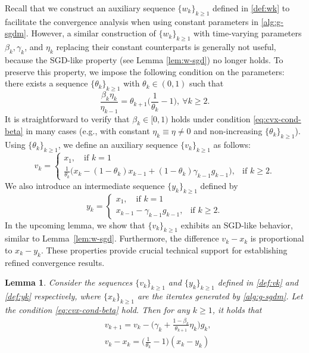 \documentclass[10pt]{article}
\numberwithin{equation}{section}
\newtheorem{lemma}{Lemma}
\theoremstyle{definition}
\begin{document}
Recall that we construct an auxiliary sequence $\{w_k\}_{k\ge 1}$ defined in \eqref{def:wk} to facilitate the convergence analysis when using constant parameters in \eqref{alg:g-sgdm}. However, a similar construction of $\{w_k\}_{k\ge 1}$ with time-varying parameters $\beta_k, \gamma_k$, and $\eta_k$ replacing their constant counterparts is generally not useful, because the SGD-like property (see Lemma \ref{lem:w-sgd}) no longer holds. To preserve this property, we impose the following condition on the parameters: there exists a sequence $\{\theta_k\}_{k\ge 1}$ with $\theta_k\in (0, 1)$ such that
\begin{equation}\label{eq:cvx-cond-beta}
\frac{\beta_k\eta_k}{\eta_{k-1}}=\theta_{k+1}\Big(\frac{1}{\theta_k}-1\Big),~\forall k\ge 2.
\end{equation}
It is straightforward to verify that $\beta_k\in [0, 1)$ holds under condition \eqref{eq:cvx-cond-beta} in many cases (e.g., with constant $\eta_k\equiv\eta\neq0$ and non-increasing $\{\theta_k\}_{k\ge 1}$). Using $\{\theta_k\}_{k\ge 1}$, we define an auxiliary sequence $\{v_k\}_{k\ge 1}$ as follows:
\begin{equation}\label{def:vk}
v_k= \begin{cases} x_1, \quad \text{if } k=1 &  \\ \frac{1}{\theta_k}\big(x_k-(1-\theta_k) x_{k-1}+(1-\theta_k) \gamma_{k-1} g_{k-1}\big), & \text{if } k \ge 2.\end{cases}
\end{equation}
We also introduce an intermediate sequence $\{y_k\}_{k\ge 1}$ defined by
\begin{equation}\label{def:yk}
y_k= \begin{cases} x_1, \quad \text{if } k=1 &  \\ x_{k-1}-\gamma_{k-1}g_{k-1}, & \text{if } k \ge 2.\end{cases}
\end{equation}
In the upcoming lemma, we show that $\{v_k\}_{k\ge 1}$ exhibits an SGD-like behavior, similar to Lemma~\ref{lem:w-sgd}. Furthermore, the difference $v_k-x_k$ is proportional to $x_k-y_k$. These properties provide crucial technical support for establishing refined convergence results.
\begin{lemma}\label{lem:v-sgd}
Consider the sequences $\{v_k\}_{k\ge 1}$ and $\{y_k\}_{k\ge 1}$ defined in \eqref{def:vk} and \eqref{def:yk} respectively, where $\{x_k\}_{k\ge 1}$ are the iterates generated by \eqref{alg:g-sgdm}. Let the condition \eqref{eq:cvx-cond-beta} hold.
Then for any $k\ge 1$, it holds that
\begin{align}
    &v_{k+1}=v_k-\Big(\gamma_k+\frac{1-\beta_k}{\theta_{k+1}}\eta_k\Big) g_k,\label{eq:v-sgd}\\
    &v_k-x_k = \Big(\frac{1}{\theta_k}-1\Big)(x_k-y_k)\label{eq:v-x}
\end{align}
\end{lemma}
\end{document}

